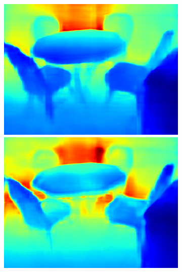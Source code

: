 \begin{figure}[htb]
\begin{subfigure}{0.15\linewidth}
\begin{minipage}[t]{1\linewidth}
  \includegraphics[width=1\linewidth]{figure/nyu_result/kitchen_rgb_00760.png}
  \includegraphics[width=1\linewidth]{figure/nyu_without/kitchen_rgb_00760.png}
  \end{minipage}%
  
  \end{subfigure}
  \begin{subfigure}{0.15\linewidth}
    

\end{subfigure}
\end{figure}
